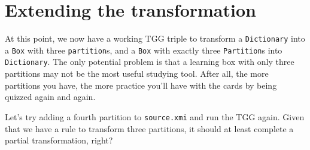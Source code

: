 \newpage
\section{Extending the transformation}
\genHeader







At this point, we now have a working TGG triple to transform a \texttt{Dictionary} into a \texttt{Box} with three \texttt{partition}s, and a \texttt{Box} with
exactly three \texttt{Partition}s into \texttt{Dictionary}. The only potential problem is that a learning box with only three partitions may not be the most
useful studying tool. After all, the more partitions you have, the more practice you'll have with the cards by being quizzed again and again.

Let's try adding a fourth partition to \texttt{source.xmi} and run the TGG again. Given that we have a rule to transform three partitions, it should at least
complete a partial transformation, right? 

